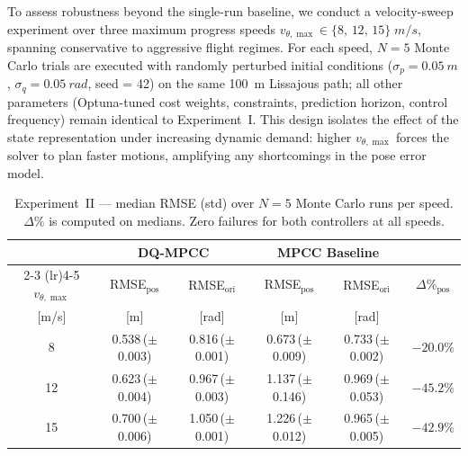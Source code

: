 

To assess robustness beyond the single-run baseline, we conduct a
velocity-sweep experiment over three maximum progress speeds
$v_{\theta,\max} \in \{8,\,12,\,15\}\;\si{m/s}$,
spanning conservative to aggressive flight regimes.
For each speed, $N = 5$ Monte Carlo trials are executed with
randomly perturbed initial conditions
($\sigma_p = \SI{0.05}{m}$, $\sigma_q = \SI{0.05}{rad}$,
 seed = 42)
on the same \SI{100}{m} Lissajous path; all other parameters
(Optuna-tuned cost weights, constraints, prediction horizon,
control frequency) remain identical to Experiment~I.
This design isolates the effect of the state representation under
increasing dynamic demand: higher $v_{\theta,\max}$ forces the solver
to plan faster motions, amplifying any shortcomings in the pose
error model.

\begin{table}[t]
  \centering
  \caption{Experiment~II — median RMSE (std) over $N=5$ Monte Carlo
           runs per speed.  $\Delta\%$ is computed on medians.
           Zero failures for both controllers at all speeds.}
  \label{tab:exp2}
  \setlength{\tabcolsep}{3pt}
  \footnotesize
  \begin{tabular}{c cc cc c}
    \toprule
    & \multicolumn{2}{c}{\textbf{DQ-MPCC}}
    & \multicolumn{2}{c}{\textbf{MPCC Baseline}}
    & \\
    \cmidrule(lr){2-3} \cmidrule(lr){4-5}
    $v_{\theta,\max}$
    & {RMSE$_{\text{pos}}$}
    & {RMSE$_{\text{ori}}$}
    & {RMSE$_{\text{pos}}$}
    & {RMSE$_{\text{ori}}$}
    & {$\Delta\%_{\text{pos}}$} \\
    {[m/s]}
    & {[m]}
    & {[rad]}
    & {[m]}
    & {[rad]}
    & \\
    \midrule
    8
    & 0.538\,{\scriptsize($\pm$0.003)}
    & 0.816\,{\scriptsize($\pm$0.001)}
    & 0.673\,{\scriptsize($\pm$0.009)}
    & 0.733\,{\scriptsize($\pm$0.002)}
    & $-20.0\%$ \\
    12
    & 0.623\,{\scriptsize($\pm$0.004)}
    & 0.967\,{\scriptsize($\pm$0.003)}
    & 1.137\,{\scriptsize($\pm$0.146)}
    & 0.969\,{\scriptsize($\pm$0.053)}
    & $-45.2\%$ \\
    15
    & 0.700\,{\scriptsize($\pm$0.006)}
    & 1.050\,{\scriptsize($\pm$0.001)}
    & 1.226\,{\scriptsize($\pm$0.012)}
    & 0.965\,{\scriptsize($\pm$0.005)}
    & $-42.9\%$ \\
    \bottomrule
  \end{tabular}
\end{table}

